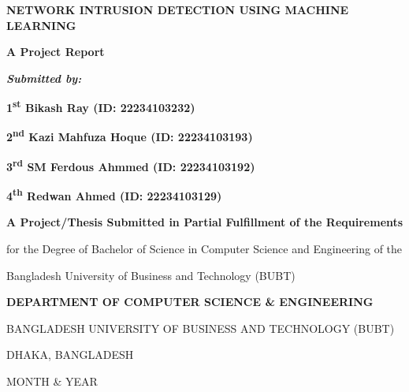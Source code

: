 \documentclass[12pt, a4paper]{report}
\begin{document}
\justifying

\begin{titlepage}
\begin{center}
\vspace*{0.5cm}
{\fontsize{22}{26}\selectfont\bfseries NETWORK INTRUSION DETECTION USING MACHINE LEARNING \par}
\vspace{1.5cm}
{\fontsize{14}{17}\selectfont\bfseries A Project Report \par}
\vspace{1.5cm}
{\fontsize{14}{17}\selectfont\itshape\bfseries Submitted by: \par}
\vspace{0.5cm}
{\fontsize{14}{17}\selectfont\bfseries 1\textsuperscript{st} Bikash Ray (ID: 22234103232) \par}
{\fontsize{14}{17}\selectfont\bfseries 2\textsuperscript{nd} Kazi Mahfuza Hoque (ID: 22234103193) \par}
{\fontsize{14}{17}\selectfont\bfseries 3\textsuperscript{rd} SM Ferdous Ahmmed (ID: 22234103192) \par}
{\fontsize{14}{17}\selectfont\bfseries 4\textsuperscript{th} Redwan Ahmed (ID: 22234103129) \par}
\vspace{1.5cm}
{\fontsize{14}{17}\selectfont\bfseries A Project/Thesis Submitted in Partial Fulfillment of the Requirements \par
for the Degree of Bachelor of Science in Computer Science and Engineering of the \par
Bangladesh University of Business and Technology (BUBT) \par}
\vspace{2cm}

\vspace{1cm}

{\fontsize{10}{12}\selectfont\bfseries DEPARTMENT OF COMPUTER SCIENCE \& ENGINEERING \par
BANGLADESH UNIVERSITY OF BUSINESS AND TECHNOLOGY (BUBT) \par
DHAKA, BANGLADESH \par
MONTH \& YEAR \par}
\end{center}
\end{titlepage}

\pagestyle{plain}
\end{document}
